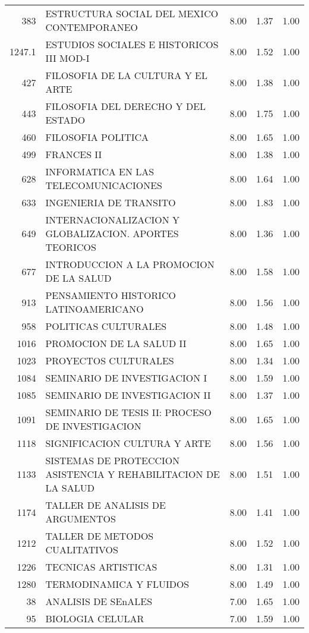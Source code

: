 \documentclass[12pt]{article}
\begin{document}
\begin{table}[ht]
\begin{tabular}{rlrrr}
  383 & ESTRUCTURA SOCIAL DEL MEXICO CONTEMPORANEO & 8.00 & 1.37 & 1.00 \\ 
  1247.1 & ESTUDIOS SOCIALES E HISTORICOS III MOD-I & 8.00 & 1.52 & 1.00 \\ 
  427 & FILOSOFIA DE LA CULTURA Y EL ARTE & 8.00 & 1.38 & 1.00 \\ 
  443 & FILOSOFIA DEL DERECHO Y DEL ESTADO & 8.00 & 1.75 & 1.00 \\ 
  460 & FILOSOFIA POLITICA & 8.00 & 1.65 & 1.00 \\ 
  499 & FRANCES II & 8.00 & 1.38 & 1.00 \\ 
  628 & INFORMATICA EN LAS TELECOMUNICACIONES & 8.00 & 1.64 & 1.00 \\ 
  633 & INGENIERIA DE TRANSITO & 8.00 & 1.83 & 1.00 \\ 
  649 & INTERNACIONALIZACION Y GLOBALIZACION. APORTES TEORICOS & 8.00 & 1.36 & 1.00 \\ 
  677 & INTRODUCCION A LA PROMOCION DE LA SALUD & 8.00 & 1.58 & 1.00 \\ 
  913 & PENSAMIENTO HISTORICO LATINOAMERICANO & 8.00 & 1.56 & 1.00 \\ 
  958 & POLITICAS CULTURALES & 8.00 & 1.48 & 1.00 \\ 
  1016 & PROMOCION DE LA SALUD II & 8.00 & 1.65 & 1.00 \\ 
  1023 & PROYECTOS CULTURALES & 8.00 & 1.34 & 1.00 \\ 
  1084 & SEMINARIO DE INVESTIGACION I & 8.00 & 1.59 & 1.00 \\ 
  1085 & SEMINARIO DE INVESTIGACION II & 8.00 & 1.37 & 1.00 \\ 
  1091 & SEMINARIO DE TESIS II: PROCESO DE INVESTIGACION & 8.00 & 1.65 & 1.00 \\ 
  1118 & SIGNIFICACION CULTURA Y ARTE & 8.00 & 1.56 & 1.00 \\ 
  1133 & SISTEMAS DE PROTECCION ASISTENCIA Y REHABILITACION DE LA SALUD & 8.00 & 1.51 & 1.00 \\ 
  1174 & TALLER DE ANALISIS DE ARGUMENTOS & 8.00 & 1.41 & 1.00 \\ 
  1212 & TALLER DE METODOS CUALITATIVOS & 8.00 & 1.52 & 1.00 \\ 
  1226 & TECNICAS ARTISTICAS & 8.00 & 1.31 & 1.00 \\ 
  1280 & TERMODINAMICA Y FLUIDOS & 8.00 & 1.49 & 1.00 \\ 
  38 & ANALISIS DE SEnALES & 7.00 & 1.65 & 1.00 \\ 
  95 & BIOLOGIA CELULAR & 7.00 & 1.59 & 1.00 \\ 

\end{tabular}
\end{table}
\end{document}
